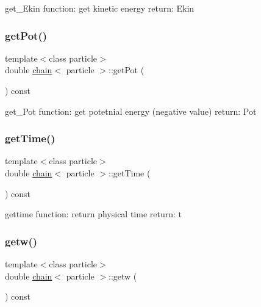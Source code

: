 get\+\_\+\+Ekin function\+: get kinetic energy return\+: Ekin 

\hypertarget{classchain_a0a0a6fb28cad0a841cd6c8e8dafa5055}{}\label{classchain_a0a0a6fb28cad0a841cd6c8e8dafa5055} 
\subsubsection{\texorpdfstring{get\+Pot()}{getPot()}}
{\footnotesize\ttfamily template$<$class particle$>$ \\
double \hyperlink{classchain}{chain}$<$ particle $>$\+::get\+Pot (\begin{DoxyParamCaption}{ }\end{DoxyParamCaption}) const\hspace{0.3cm}{\ttfamily [inline]}}



get\+\_\+\+Pot function\+: get potetnial energy (negative value) return\+: Pot 

\hypertarget{classchain_ae17d47b7c94181f9aa15b59c772a4fae}{}\label{classchain_ae17d47b7c94181f9aa15b59c772a4fae} 
\subsubsection{\texorpdfstring{get\+Time()}{getTime()}}
{\footnotesize\ttfamily template$<$class particle$>$ \\
double \hyperlink{classchain}{chain}$<$ particle $>$\+::get\+Time (\begin{DoxyParamCaption}{ }\end{DoxyParamCaption}) const\hspace{0.3cm}{\ttfamily [inline]}}



gettime function\+: return physical time return\+: t 

\hypertarget{classchain_aae4b94cc13a4a8e4f81f5874ecaf50bc}{}\label{classchain_aae4b94cc13a4a8e4f81f5874ecaf50bc} 
\subsubsection{\texorpdfstring{getw()}{getw()}}
{\footnotesize\ttfamily template$<$class particle$>$ \\
double \hyperlink{classchain}{chain}$<$ particle $>$\+::getw (\begin{DoxyParamCaption}{ }\end{DoxyParamCaption}) const\hspace{0.3cm}{\ttfamily [inline]}}



